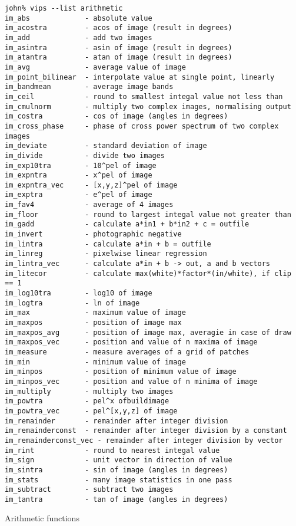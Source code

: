 \begin{fig2}
\begin{verbatim}
john% vips --list arithmetic
im_abs             - absolute value
im_acostra         - acos of image (result in degrees)
im_add             - add two images
im_asintra         - asin of image (result in degrees)
im_atantra         - atan of image (result in degrees)
im_avg             - average value of image
im_point_bilinear  - interpolate value at single point, linearly
im_bandmean        - average image bands
im_ceil            - round to smallest integal value not less than
im_cmulnorm        - multiply two complex images, normalising output
im_costra          - cos of image (angles in degrees)
im_cross_phase     - phase of cross power spectrum of two complex images
im_deviate         - standard deviation of image
im_divide          - divide two images
im_exp10tra        - 10^pel of image
im_expntra         - x^pel of image
im_expntra_vec     - [x,y,z]^pel of image
im_exptra          - e^pel of image
im_fav4            - average of 4 images
im_floor           - round to largest integal value not greater than
im_gadd            - calculate a*in1 + b*in2 + c = outfile
im_invert          - photographic negative
im_lintra          - calculate a*in + b = outfile
im_linreg          - pixelwise linear regression
im_lintra_vec      - calculate a*in + b -> out, a and b vectors
im_litecor         - calculate max(white)*factor*(in/white), if clip == 1
im_log10tra        - log10 of image
im_logtra          - ln of image
im_max             - maximum value of image
im_maxpos          - position of image max
im_maxpos_avg      - position of image max, averagie in case of draw
im_maxpos_vec      - position and value of n maxima of image
im_measure         - measure averages of a grid of patches
im_min             - minimum value of image
im_minpos          - position of minimum value of image
im_minpos_vec      - position and value of n minima of image
im_multiply        - multiply two images
im_powtra          - pel^x ofbuildimage
im_powtra_vec      - pel^[x,y,z] of image
im_remainder       - remainder after integer division
im_remainderconst  - remainder after integer division by a constant
im_remainderconst_vec - remainder after integer division by vector 
im_rint            - round to nearest integal value
im_sign            - unit vector in direction of value
im_sintra          - sin of image (angles in degrees)
im_stats           - many image statistics in one pass
im_subtract        - subtract two images
im_tantra          - tan of image (angles in degrees)
\end{verbatim}
\caption{Arithmetic functions}
\label{fg:arithmetic}
\end{fig2}

